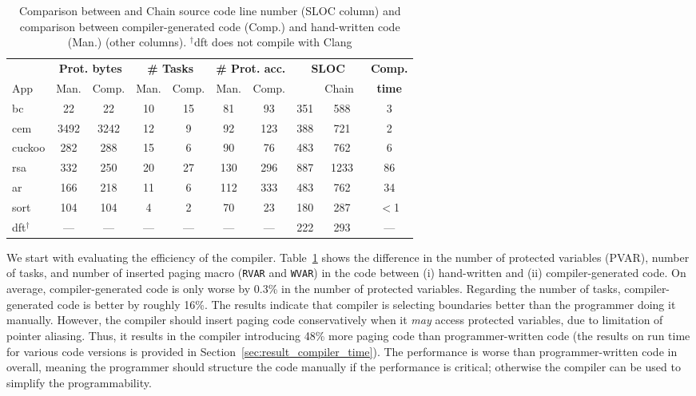 \begin{table}[t]
	\centering
	\footnotesize
        \renewcommand{\tabcolsep}{1pt}
	\begin{tabular}{|l|cc|cc|cc|cc|c|}
		\hline
		{} & \multicolumn{2}{c|}{{\bf Prot. bytes}} & \multicolumn{2}{c|}{{\bf \# Tasks}} & \multicolumn{2}{c|}{{\bf \# Prot. acc.}} & \multicolumn{2}{c|}{\bf SLOC} & {\bf Comp.} \\
		App & Man. & Comp. & Man. & Comp. & Man. & Comp. & \multicolumn{1}{l}{\sys} & \multicolumn{1}{r|}{Chain~\cite{chain}} & {\bf time} \\
		\hline\hline
		bc & 22 & 22 & 10 & 15 & 81 & 93 & 351 &588 & 3\\
		cem & 3492 & 3242 & 12 & 9 & 92 & 123 & 388 &721 & 2\\
		cuckoo & 282 & 288 & 15 & 6 & 90 & 76 & 483 &762 & 6\\
		rsa & 332 & 250 & 20 & 27 & 130 & 296 & 887 &1233 & 86\\
		ar & 166 & 218 & 11 & 6 & 112 & 333 & 483 &762 & 34\\
		sort & 104 & 104 & 4 & 2 & 70 & 23 & 180 & 287 & $<$1\\
		dft$^\dagger$ & --- & --- & --- & --- & --- & --- & 222 & 293 & ---\\
		\hline
	\end{tabular}
	\caption{Comparison between \sys and Chain source code line number (SLOC column) and comparison between compiler-generated \sys code (Comp.) and hand-written \sys code (Man.) (other columns). $^\dagger$dft does not compile with Clang}
\label{table:compiler_result}
\end{table}

We start with evaluating the efficiency of the \sys compiler. Table~\ref{table:compiler_result} shows the difference in the number of protected variables (PVAR), number of tasks, and number of inserted paging macro ({\tt RVAR} and {\tt WVAR}) in the code between (i) hand-written \sys and (ii) compiler-generated \sys code. On average, compiler-generated code is only worse by 0.3\% in the number of protected variables. Regarding the number of tasks, compiler-generated code is better by roughly 16\%. The results indicate that \sys compiler is selecting boundaries better than the programmer doing it manually. However, the \sys compiler should insert paging code conservatively when it {\em may} access protected variables, due to limitation of pointer aliasing. Thus, it results in the \sys compiler introducing 48\% more paging code than programmer-written code (the results on run time for various \sys code versions is provided in Section~\ref{sec:result_compiler_time}). The performance is worse than programmer-written \sys code in overall, meaning the programmer should structure the code manually if the performance is critical; otherwise the compiler can be used to simplify the programmability. 


